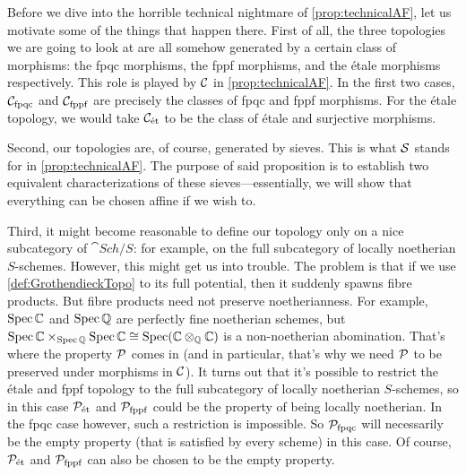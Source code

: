 \documentclass[a4paper, 10pt, oneside, DIV=9, chapterprefix=true, numbers=enddot, bibliography=totoc]{scrbook}
\begin{document}
\begin{rem*}\label{rem*:clarificationsForTechnicalAF}
	Before we dive into the horrible technical nightmare of \cref{prop:technicalAF}, let us motivate some of the things that happen there. First of all, the three topologies we are going to look at are all somehow generated by a certain class of morphisms: the fpqc morphisms, the fppf morphisms, and the étale morphisms respectively. This role is played by $\mathcal{C}$ in \cref{prop:technicalAF}. In the first two cases, $\mathcal{C}_{\mathrm{fpqc}}$ and $\mathcal{C}_{\mathrm{fppf}}$ are precisely the classes of fpqc and fppf morphisms. For the étale topology, we would take $\mathcal{C}_{\mathrm{\acute{e}t}}$ to be the class of étale and surjective morphisms.
	
	Second, our topologies are, of course, generated by sieves. This is what $\mathcal{S}$ stands for in \cref{prop:technicalAF}. The purpose of said proposition is to establish two equivalent characterizations of these sieves---essentially, we will show that everything can be chosen affine if we wish to.
	
	Third, it might become reasonable to define our topology only on a nice subcategory of $\cat{Sch}/S$: for example, on the full subcategory of locally noetherian $S$-schemes. However, this might get us into trouble. The problem is that if we use \cref{def:GrothendieckTopo} to its full potential, then it suddenly spawns fibre products. But fibre products need not preserve noetherianness. For example, $\operatorname{Spec} \mathbb{C}$ and $\operatorname{Spec} \mathbb{Q}$ are perfectly fine noetherian schemes, but $\operatorname{Spec} \mathbb{C}\times_{\operatorname{Spec} \mathbb{Q}}\operatorname{Spec} \mathbb{C}\cong \operatorname{Spec} (\mathbb{C}\otimes_{\mathbb{Q}}\mathbb{C})$ is a non-noetherian abomination. That's where the property $\mathcal{P}$ comes in (and in particular, that's why we need $\mathcal{P}$ to be preserved under morphisms in $\mathcal{C}$). It turns out that it's possible to restrict the étale and fppf topology to the full subcategory of locally noetherian $S$-schemes, so in this case $\mathcal{P}_{\mathrm{\acute{e}t}}$ and $\mathcal{P}_{\mathrm{fppf}}$ could be the property of being locally noetherian. In the fpqc case however, such a restriction is impossible. So $\mathcal{P}_{\mathrm{fpqc}}$ will necessarily be the empty property (that is satisfied by every scheme) in this case. Of course, $\mathcal{P}_{\mathrm{\acute{e}t}}$ and $\mathcal{P}_{\mathrm{fppf}}$ can also be chosen to be the empty property.
\end{rem*}
\end{document}
